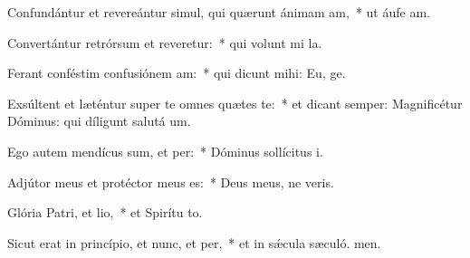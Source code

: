 \item Confundántur et revereántur simul, qui quærunt ánimam am,~* ut áufe am.
\item Convertántur retrórsum et reveretur:~* qui volunt mi la.
\item Ferant conféstim confusiónem am:~* qui dicunt mihi: Eu, ge.
\item Exsúltent et læténtur super te omnes quætes te:~* et dicant semper: Magnificétur Dóminus: qui díligunt salutá um.
\item Ego autem mendícus sum, et per:~* Dóminus sollícitus  i.
\item Adjútor meus et protéctor meus  es:~* Deus meus, ne veris.
\item Glória Patri, et lio,~* et Spirítu to.
\item Sicut erat in princípio, et nunc, et per,~* et in sǽcula sæculó. men.
